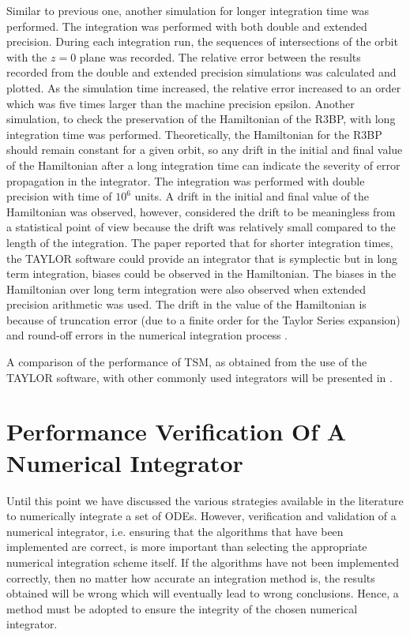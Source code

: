 Similar to previous one, another simulation for longer integration time was performed. The integration was performed with both double and extended precision. During each integration run, the sequences of intersections of the orbit with the $z=0$ plane was recorded. The relative error between the results recorded from the double and extended precision simulations was calculated and plotted. As the simulation time increased, the relative error increased to an order which was five times larger than the machine precision epsilon. Another simulation, to check the preservation of the Hamiltonian of the \gls{R3BP}, with long integration time was performed. Theoretically, the Hamiltonian for the \gls{R3BP} should remain constant for a given orbit, so any drift in the initial and final value of the Hamiltonian after a long integration time can indicate the severity of error propagation in the integrator. The integration was performed with double precision with time of $10^6$ units. A drift in the initial and final value of the Hamiltonian was observed, however, \cite{taylorSoftware} considered the drift to be meaningless from a statistical point of view because the drift was relatively small compared to the length of the integration. The paper reported that for shorter integration times, the TAYLOR software could provide an integrator that is symplectic but in long term integration, biases could be observed in the Hamiltonian. The biases in the Hamiltonian over long term integration were also observed when extended precision arithmetic was used. The drift in the value of the Hamiltonian is because of truncation error (due to a finite order for the Taylor Series expansion) and round-off errors in the numerical integration process \cite{taylorSoftware}.

A comparison of the performance of \gls{TSM}, as obtained from the use of the TAYLOR software, with other commonly used integrators will be presented in .

\section{Performance Verification Of A Numerical Integrator}
\label{integ_verify}
Until this point we have discussed the various strategies available in the literature to numerically integrate a set of \gls{ODE}s. However, verification and validation of a numerical integrator, i.e. ensuring that the algorithms that have been implemented are correct, is more important than selecting the appropriate numerical integration scheme itself. If the algorithms have not been implemented correctly, then no matter how accurate an integration method is, the results obtained will be wrong which will eventually lead to wrong conclusions. Hence, a method must be adopted to ensure the integrity of the chosen numerical integrator.

